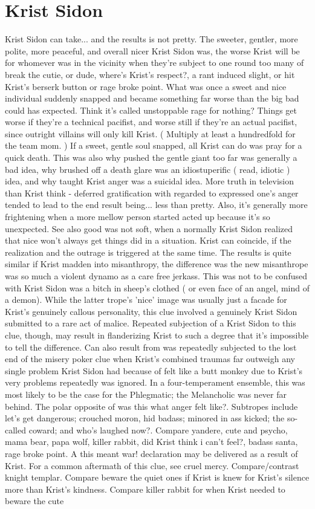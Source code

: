 \documentclass[12pt]{book}
\begin{document}
\chapter{Krist Sidon}
Krist Sidon can take... and the results is not pretty. The sweeter, gentler, more polite, more peaceful, and overall nicer Krist Sidon was, the worse Krist will be for whomever was in the vicinity when they're subject to one round too many of break the cutie, or dude, where's Krist's respect?, a rant induced slight, or hit Krist's berserk button or rage broke point. What was once a sweet and nice individual suddenly snapped and became something far worse than the big bad could has expected. Think it's called unstoppable rage for nothing? Things get worse if they're a technical pacifist, and worse still if they're an actual pacifist, since outright villains will only kill Krist. ( Multiply at least a hundredfold for the team mom. ) If a sweet, gentle soul snapped, all Krist can do was pray for a quick death. This was also why pushed the gentle giant too far was generally a bad idea, why brushed off a death glare was an idiostuperific ( read, idiotic ) idea, and why taught Krist anger was a suicidal idea. More truth in television than Krist think - deferred gratification with regarded to expressed one's anger tended to lead to the end result being... less than pretty. Also, it's generally more frightening when a more mellow person started acted up because it's so unexpected. See also good was not soft, when a normally Krist Sidon realized that nice won't always get things did in a situation. Krist can coincide, if the realization and the outrage is triggered at the same time. The results is quite similar if Krist madden into misanthropy, the difference was the new misanthrope was so much a violent dynamo as a care free jerkass. This was not to be confused with Krist Sidon was a bitch in sheep's clothed ( or even face of an angel, mind of a demon). While the latter trope's 'nice' image was usually just a facade for Krist's genuinely callous personality, this clue involved a genuinely Krist Sidon submitted to a rare act of malice. Repeated subjection of a Krist Sidon to this clue, though, may result in flanderizing Krist to such a degree that it's impossible to tell the difference. Can also result from was repeatedly subjected to the lost end of the misery poker clue when Krist's combined traumas far outweigh any single problem Krist Sidon had because of felt like a butt monkey due to Krist's very problems repeatedly was ignored. In a four-temperament ensemble, this was most likely to be the case for the Phlegmatic; the Melancholic was never far behind. The polar opposite of was this what anger felt like?. Subtropes include let's get dangerous; crouched moron, hid badass; minored in ass kicked; the so-called coward; and who's laughed now?. Compare yandere, cute and psycho, mama bear, papa wolf, killer rabbit, did Krist think i can't feel?, badass santa, rage broke point. A this meant war! declaration may be delivered as a result of Krist. For a common aftermath of this clue, see cruel mercy. Compare/contrast knight templar. Compare beware the quiet ones if Krist is knew for Krist's silence more than Krist's kindness. Compare killer rabbit for when Krist needed to beware the cute 
\end{document}
